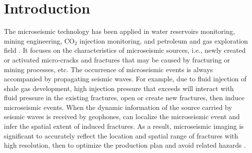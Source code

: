 \section{Introduction}
The microseismic technology has been applied in water reservoirs monitoring, mining engineering, CO$_2$ injection monitoring, and petroleum and gas exploration field . It focuses on the characteristics of microseismic sources, i.e., newly created or activated micro-cracks and fractures that may be caused by fracturing or mining processes, etc. The occurrence of microseismic events is always accompanied by propagating seismic waves. For example, due to fluid injection of shale gas development, high injection pressure that exceeds  will interact with fluid pressure in the existing fractures, open or create new fractures, then induce microseismic events.  When the dynamic information of the source carried by seismic waves is received by geophones,  can localize the microseismic event and infer the spatial extent of induced fractures. As a result, microseismic imaging is significant to accurately reflect the location and spatial range of fractures with high resolution, then to optimize the production plan and avoid related hazards \cite[]{Nidhal2015}.

